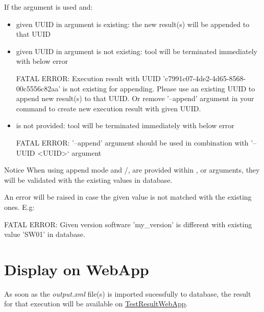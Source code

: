     If the argument  is used and:
    \begin{itemize}
      \item given UUID in  argument is existing: 
            the new result(s) will be appended to that UUID
      \item given UUID in  argument is not existing: 
            tool will be terminated immediately with below error
\begin{robotlog}
FATAL ERROR: Execution result with UUID 'c7991c07-4de2-4d65-8568-00c5556c82aa' is not existing for appending.
             Please use an existing UUID to append new result(s) to that UUID.
             Or remove '--append' argument in your command to create new execution result with given UUID.
\end{robotlog}
      \item {} is not provided: 
            tool will be terminated immediately with below error
\begin{robotlog}
FATAL ERROR: '--append' argument should be used in combination with '--UUID <UUID>` argument
\end{robotlog}
    \end{itemize} 

    \begin{boxhint} {Notice}
      When using append mode and /, 
       are provided within , 
       or  arguments, they will 
      be validated with the existing values in database. 
      
      An error will be raised in case the given value is not matched with the 
      existing ones. E.g:
\begin{robotlog}
FATAL ERROR: Given version software 'my_version' is different with existing value 'SW01' in database.
\end{robotlog}
    \end{boxhint}

\newpage
\hypertarget{description-display-on-webapp}{%
\section{Display on WebApp}\label{description-display-on-webapp}}

As soon as the \emph{output.xml} file(s) is imported sucessfully to database, 
the result for that execution will be available on
\href{https://github.com/test-fullautomation/testresultwebapp}{TestResultWebApp}.

